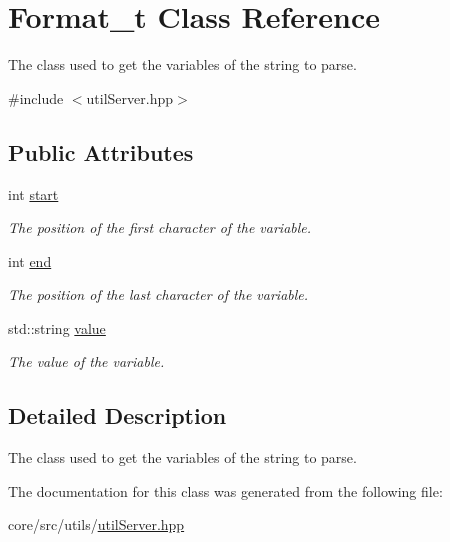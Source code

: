\hypertarget{classFormat__t}{
\section{Format\_\-t Class Reference}
\label{classFormat__t}
}


The class used to get the variables of the string to parse.  




{\ttfamily \#include $<$utilServer.hpp$>$}

\subsection*{Public Attributes}
\begin{DoxyCompactItemize}
\item 
\hypertarget{classFormat__t_a1f2650b547e8e887adfa64fb66586221}{
int \hyperlink{classFormat__t_a1f2650b547e8e887adfa64fb66586221}{start}}
\label{classFormat__t_a1f2650b547e8e887adfa64fb66586221}

\begin{DoxyCompactList}\small\item\em The position of the first character of the variable. \item\end{DoxyCompactList}\item 
\hypertarget{classFormat__t_a1c612c68847a8987b5148f223b87ebca}{
int \hyperlink{classFormat__t_a1c612c68847a8987b5148f223b87ebca}{end}}
\label{classFormat__t_a1c612c68847a8987b5148f223b87ebca}

\begin{DoxyCompactList}\small\item\em The position of the last character of the variable. \item\end{DoxyCompactList}\item 
\hypertarget{classFormat__t_a9545825afdecf274b3b52d023e303bc0}{
std::string \hyperlink{classFormat__t_a9545825afdecf274b3b52d023e303bc0}{value}}
\label{classFormat__t_a9545825afdecf274b3b52d023e303bc0}

\begin{DoxyCompactList}\small\item\em The value of the variable. \item\end{DoxyCompactList}\end{DoxyCompactItemize}


\subsection{Detailed Description}
The class used to get the variables of the string to parse. 

The documentation for this class was generated from the following file:\begin{DoxyCompactItemize}
\item 
core/src/utils/\hyperlink{utilServer_8hpp}{utilServer.hpp}\end{DoxyCompactItemize}
